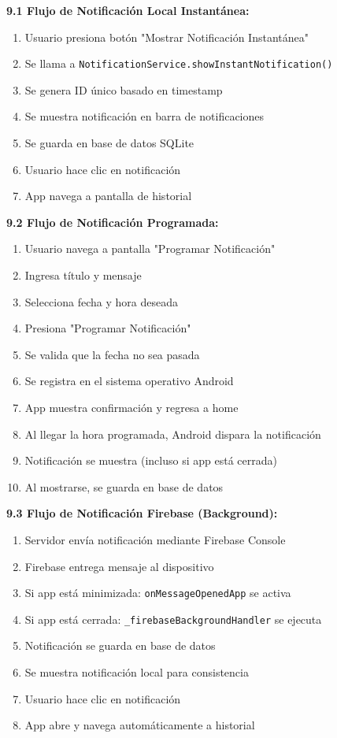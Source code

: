 \documentclass[12pt,a4paper]{article}
\begin{document}
\textbf{9.1 Flujo de Notificación Local Instantánea:}

\begin{enumerate}
    \item Usuario presiona botón "Mostrar Notificación Instantánea"
    \item Se llama a \texttt{NotificationService.showInstantNotification()}
    \item Se genera ID único basado en timestamp
    \item Se muestra notificación en barra de notificaciones
    \item Se guarda en base de datos SQLite
    \item Usuario hace clic en notificación
    \item App navega a pantalla de historial
\end{enumerate}

\textbf{9.2 Flujo de Notificación Programada:}

\begin{enumerate}
    \item Usuario navega a pantalla "Programar Notificación"
    \item Ingresa título y mensaje
    \item Selecciona fecha y hora deseada
    \item Presiona "Programar Notificación"
    \item Se valida que la fecha no sea pasada
    \item Se registra en el sistema operativo Android
    \item App muestra confirmación y regresa a home
    \item Al llegar la hora programada, Android dispara la notificación
    \item Notificación se muestra (incluso si app está cerrada)
    \item Al mostrarse, se guarda en base de datos
\end{enumerate}

\textbf{9.3 Flujo de Notificación Firebase (Background):}

\begin{enumerate}
    \item Servidor envía notificación mediante Firebase Console
    \item Firebase entrega mensaje al dispositivo
    \item Si app está minimizada: \texttt{onMessageOpenedApp} se activa
    \item Si app está cerrada: \texttt{\_firebaseBackgroundHandler} se ejecuta
    \item Notificación se guarda en base de datos
    \item Se muestra notificación local para consistencia
    \item Usuario hace clic en notificación
    \item App abre y navega automáticamente a historial
\end{enumerate}
\end{document}
